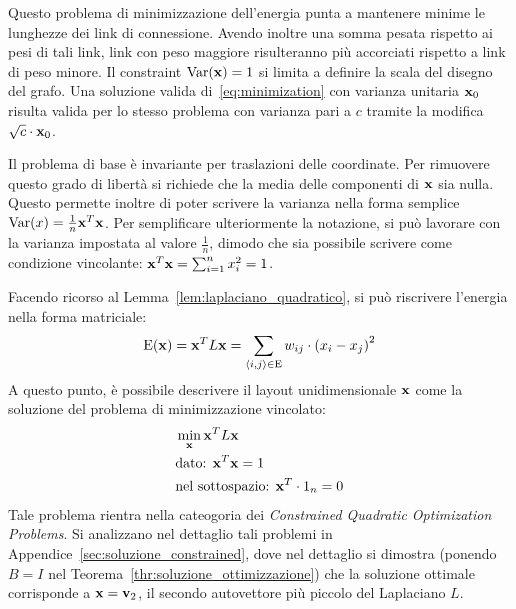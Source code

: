 \documentclass[10pt,a4paper]{article}
\newcommand{\Var}{\mathrm{Var}}
\newcommand{\E}{\mathrm{E}}
\begin{document}
Questo problema di minimizzazione dell'energia punta a mantenere minime le lunghezze dei link di connessione.
Avendo inoltre una somma pesata rispetto ai pesi di tali link, link con peso maggiore risulteranno più accorciati rispetto a link di peso minore.
Il constraint \(\Var(\vb{x}) = 1\) si limita a definire la scala del disegno del grafo. Una soluzione valida di~\eqref{eq:minimization} con varianza unitaria \(\vb{x}_0\) risulta valida per lo stesso problema con varianza pari a \(c\) tramite la modifica \(\sqrt{c}\cdot\vb{x}_0\).

Il problema di base è invariante per traslazioni delle coordinate.
Per rimuovere questo grado di libertà si richiede che la media delle componenti di \(\vb{x}\) sia nulla.
Questo permette inoltre di poter scrivere la varianza nella forma semplice \(\Var(x) = \frac{1}{n}\vb{x}^T\vb{x}\).
Per semplificare ulteriormente la notazione, si può lavorare con la varianza impostata al valore \(\frac{1}{n}\), dimodo che sia possibile scrivere come condizione vincolante: \(\vb{x}^T\vb{x} = \sum_{i=1}^n x_i^2 = 1\).

Facendo ricorso al Lemma~\ref{lem:laplaciano_quadratico}, si può riscrivere l'energia nella forma matriciale:
\begin{equation}
    \E(\vb{x}) = \vb{x}^T L\vb{x} = \sum_{\langle i,j\rangle\in \E} w_{ij}\cdot {(x_i - x_j)}^2
\end{equation}
A questo punto, è possibile descrivere il layout unidimensionale \(\vb{x}\) come la soluzione del problema di minimizzazione vincolato:
\begin{align}
    & \min_{\vb{x}} \vb{x}^T L\vb{x}\\
    & \text{dato: } \vb{x}^T\vb{x} = 1 \\
    & \text{nel sottospazio: } \vb{x}^T \cdot 1_n = 0
\end{align}
Tale problema rientra nella cateogoria dei \textit{Constrained Quadratic Optimization Problems}.
Si analizzano nel dettaglio tali problemi in Appendice~\ref{sec:soluzione_constrained}, dove nel dettaglio si dimostra (ponendo \(B=I\) nel Teorema~\ref{thr:soluzione_ottimizzazione}) che la soluzione ottimale corrisponde a \(\vb{x} = \vb{v}_2\), il secondo autovettore più piccolo del Laplaciano \(L\).
\end{document}
